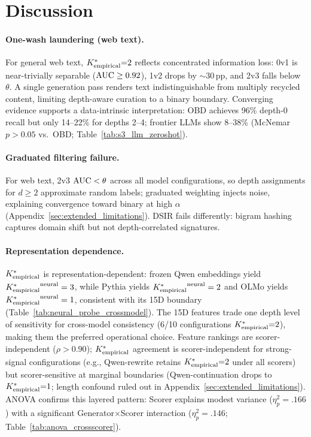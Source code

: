 \section{Discussion}
\label{sec:discussion}
\label{sec:why_kstar}
\label{sec:one_wash}
\label{sec:negative_graduated}
\label{sec:repr_dependence}
\label{sec:boundary_cases}
\label{sec:length_confound}

\paragraph{One-wash laundering (web text).}
For general web text, ${K^*_{\text{empirical}}}{=}2$ reflects concentrated information loss: 0v1 is near-trivially separable ($\text{AUC} \geq 0.92$), 1v2 drops by ${\sim}$30\,pp, and 2v3 falls below $\theta$.
A single generation pass renders text indistinguishable from multiply recycled content, limiting depth-aware curation to a binary boundary.
Converging evidence supports a data-intrinsic interpretation: OBD achieves 96\% depth-0 recall but only 14--22\% for depths 2--4; frontier LLMs show 8--38\% (McNemar $p > 0.05$ vs.\ OBD; Table~\ref{tab:s3_llm_zeroshot}).

\paragraph{Graduated filtering failure.}
For web text, 2v3 $\text{AUC} < \theta$ across all model configurations, so depth assignments for $d \geq 2$ approximate random labels; graduated weighting injects noise, explaining convergence toward binary at high $\alpha$ (Appendix~\ref{sec:extended_limitations}).
DSIR fails differently: bigram hashing captures domain shift but not depth-correlated signatures.

\paragraph{Representation dependence.}
${K^*_{\text{empirical}}}$ is representation-dependent: frozen Qwen embeddings yield ${K^*_{\text{empirical}}}^{\text{neural}} = 3$, while Pythia yields ${K^*_{\text{empirical}}}^{\text{neural}} = 2$ and OLMo yields ${K^*_{\text{empirical}}}^{\text{neural}} = 1$, consistent with its 15D boundary (Table~\ref{tab:neural_probe_crossmodel}).
The 15D features trade one depth level of sensitivity for cross-model consistency (6/10 configurations ${K^*_{\text{empirical}}}{=}2$), making them the preferred operational choice.
Feature rankings are scorer-independent ($\rho > 0.90$); ${K^*_{\text{empirical}}}$ agreement is scorer-independent for strong-signal configurations (e.g., Qwen-rewrite retains ${K^*_{\text{empirical}}}{=}2$ under all scorers) but scorer-sensitive at marginal boundaries (Qwen-continuation drops to ${K^*_{\text{empirical}}}{=}1$; length confound ruled out in Appendix~\ref{sec:extended_limitations}).
ANOVA confirms this layered pattern: Scorer explains modest variance ($\eta^2_p{=}.166$) with a significant Generator$\times$Scorer interaction ($\eta^2_p{=}.146$; Table~\ref{tab:anova_crossscorer}).

